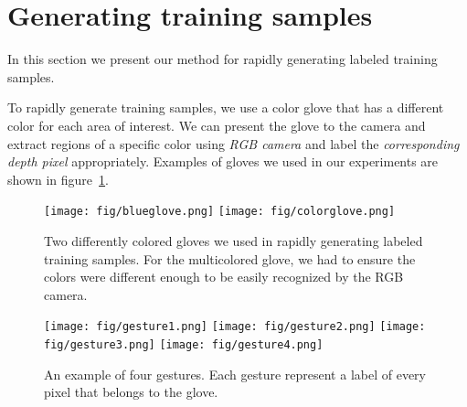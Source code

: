 \section{Generating training samples}
\label{sec: generating_training}

In this section we present our method for rapidly generating labeled training samples.

To rapidly generate training samples, we use a color glove that has a different color for each area of interest. We can present the glove to the camera and extract regions of a specific color using \textit{RGB camera} and label the \textit{corresponding depth pixel} appropriately. Examples of gloves we used in our experiments are shown in figure~\ref{fig:gloves}.

\begin{figure}
\begin{center}
\texttt{[image: fig/blueglove.png]}
\texttt{[image: fig/colorglove.png]}
\end{center}
\caption{Two differently colored gloves we used in rapidly generating labeled training samples. For the multicolored glove, we had to ensure the colors were different enough to be easily recognized by the RGB camera.}
\label{fig:gloves}
\end{figure}

\begin{figure}
\begin{center}

\texttt{[image: fig/gesture1.png]}
\texttt{[image: fig/gesture2.png]}
\texttt{[image: fig/gesture3.png]}
\texttt{[image: fig/gesture4.png]}

\end{center}
\caption{An example of four gestures. Each gesture represent a label of every pixel that belongs to the glove.  
}
\label{fig:gestures}
\end{figure}


